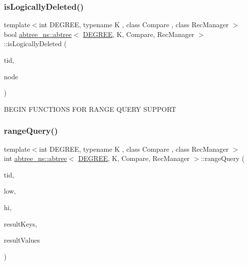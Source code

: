 \mbox{\label{classabtree__ns_1_1abtree_a761421fc00ce8627918f1a64c0188b6b}} 
\subsubsection{\texorpdfstring{is\+Logically\+Deleted()}{isLogicallyDeleted()}}
{\footnotesize\ttfamily template$<$int D\+E\+G\+R\+EE, typename K , class Compare , class Rec\+Manager $>$ \\
bool \hyperlink{classabtree__ns_1_1abtree}{abtree\+\_\+ns\+::abtree}$<$ \hyperlink{brown__sigouin__abtree__kcas_2adapter_8h_a5d88b17d70c985f2f2b8e987037fd6dd}{D\+E\+G\+R\+EE}, K, Compare, Rec\+Manager $>$\+::is\+Logically\+Deleted (\begin{DoxyParamCaption}\item[{const int}]{tid,  }\item[{\hyperlink{structabtree__ns_1_1Node}{Node}$<$ \hyperlink{brown__sigouin__abtree__kcas_2adapter_8h_a5d88b17d70c985f2f2b8e987037fd6dd}{D\+E\+G\+R\+EE}, K $>$ $\ast$}]{node }\end{DoxyParamCaption})\hspace{0.3cm}{\ttfamily [inline]}}

B\+E\+G\+IN F\+U\+N\+C\+T\+I\+O\+NS F\+OR R\+A\+N\+GE Q\+U\+E\+RY S\+U\+P\+P\+O\+RT \mbox{\label{classabtree__ns_1_1abtree_a3a820c6f4e9cc7af26106ecf808524c7}} 
\subsubsection{\texorpdfstring{range\+Query()}{rangeQuery()}\hspace{0.1cm}{\footnotesize\ttfamily [1/2]}}
{\footnotesize\ttfamily template$<$int D\+E\+G\+R\+EE, typename K , class Compare , class Rec\+Manager $>$ \\
int \hyperlink{classabtree__ns_1_1abtree}{abtree\+\_\+ns\+::abtree}$<$ \hyperlink{brown__sigouin__abtree__kcas_2adapter_8h_a5d88b17d70c985f2f2b8e987037fd6dd}{D\+E\+G\+R\+EE}, K, Compare, Rec\+Manager $>$\+::range\+Query (\begin{DoxyParamCaption}\item[{const int}]{tid,  }\item[{const K \&}]{low,  }\item[{const K \&}]{hi,  }\item[{K $\ast$const}]{result\+Keys,  }\item[{void $\ast$$\ast$const}]{result\+Values }\end{DoxyParamCaption})}


